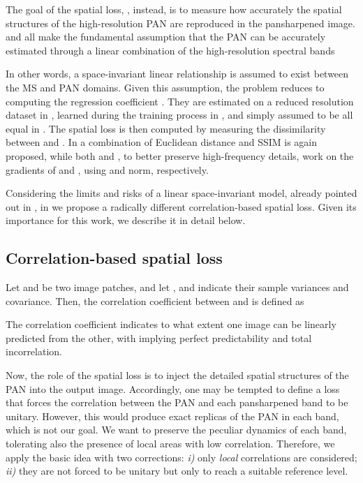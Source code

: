 \documentclass[journal]{IEEEtran}
\begin{document}
The goal of the spatial loss, , instead,
is to measure how accurately the spatial structures of the high-resolution PAN are reproduced in the pansharpened image.
\cite{Luo2020, Uezato2020} and \cite{Ma2020} all make the fundamental assumption
that the PAN can be accurately estimated through a linear combination of the high-resolution spectral bands

In other words, a space-invariant linear relationship is assumed to exist between the MS and PAN domains.
Given this assumption,
the problem reduces to computing the regression coefficient .
They are estimated on a reduced resolution dataset in \cite{Luo2020},
learned during the training process in \cite{Uezato2020}, and simply assumed to be all equal in \cite{Ma2020}.
The spatial loss is then computed by measuring the dissimilarity between  and .
In \cite{Luo2020} a combination of Euclidean distance and SSIM is again proposed,
while both \cite{Uezato2020} and \cite{Ma2020}, to better preserve high-frequency details,
work on the gradients of  and , using  and  norm, respectively.

Considering the limits and risks of a linear space-invariant model, already pointed out in \cite{Thomas2008},
in \cite{Ciotola2022} we propose a radically different correlation-based spatial loss.
Given its importance for this work, we describe it in detail below.


\subsection{Correlation-based spatial loss}

\newcommand{\wM}{{\widehat{M}}}
Let  and  be two image patches, and let ,  and  indicate their sample variances and covariance.
Then, the correlation coefficient between  and  is defined as

The correlation coefficient indicates to what extent one image can be linearly predicted from the other,
with  implying perfect predictability and  total incorrelation.

Now, the role of the spatial loss is to inject the detailed spatial structures of the PAN into the output image.
Accordingly, one may be tempted to define a loss that forces the correlation between the PAN and each pansharpened band to be unitary.
However, this would produce exact replicas of the PAN in each band, which is not our goal.
We want to preserve the peculiar dynamics of each band, tolerating also the presence of local areas with low correlation.
Therefore, we apply the basic idea with two corrections:
{\it  i)} only {\em local} correlations are considered;
{\it ii)} they are not forced to be unitary but only to reach a suitable reference level.
\end{document}
